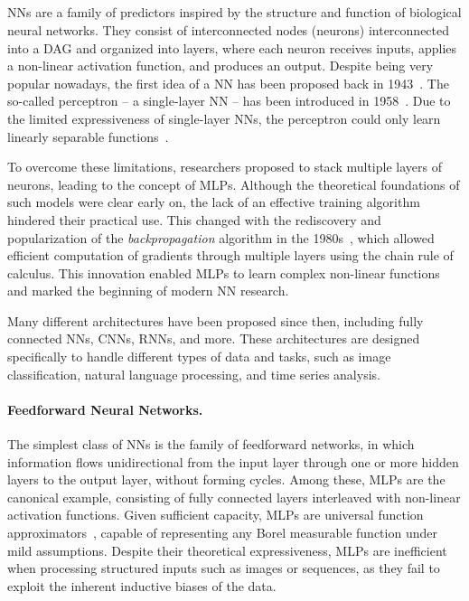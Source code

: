 \subsection[Neural networks]{}\label{subsubsec:neural-networks}
%
\Glspl{NN} are a family of predictors inspired by the structure and function of biological neural networks.
%
They consist of interconnected nodes (neurons) interconnected into a \gls{DAG} and organized into layers, where each neuron receives inputs, applies a non-linear activation function, and produces an output.
%
Despite being very popular nowadays, the first idea of a \gls{NN} has been proposed back in 1943~\cite{mcculloch1943logical}.
%
The so-called perceptron -- a single-layer \gls{NN} -- has been introduced in 1958~\cite{rosenblatt1958perceptron}.
%
Due to the limited expressiveness of single-layer \glspl{NN}, the perceptron could only learn linearly separable functions~\cite{DBLP:books/daglib/0066902}.

To overcome these limitations, researchers proposed to stack multiple layers of neurons, leading to the concept of \glspl{MLP}.
%
Although the theoretical foundations of such models were clear early on, the lack of an effective training algorithm hindered their practical use.
%
This changed with the rediscovery and popularization of the \textit{backpropagation} algorithm in the 1980s~\cite{rumelhart1986learning}, which allowed efficient computation of gradients through multiple layers using the chain rule of calculus.
%
This innovation enabled \glspl{MLP} to learn complex non-linear functions and marked the beginning of modern \gls{NN} research.

Many different architectures have been proposed since then, including fully connected \glspl{NN}, \glspl{CNN}, \glspl{RNN}, and more.
%
These architectures are designed specifically to handle different types of data and tasks, such as image classification, natural language processing, and time series analysis.

\paragraph{Feedforward Neural Networks.}
%
The simplest class of \glspl{NN} is the family of feedforward networks, in which information flows unidirectional from the input layer through one or more hidden layers to the output layer, without forming cycles.
%
Among these, \glspl{MLP} are the canonical example, consisting of fully connected layers interleaved with non-linear activation functions.
%
Given sufficient capacity, \glspl{MLP} are universal function approximators~\cite{hornik1989multilayer}, capable of representing any Borel measurable function under mild assumptions.
%
Despite their theoretical expressiveness, \glspl{MLP} are inefficient when processing structured inputs such as images or sequences, as they fail to exploit the inherent inductive biases of the data.

